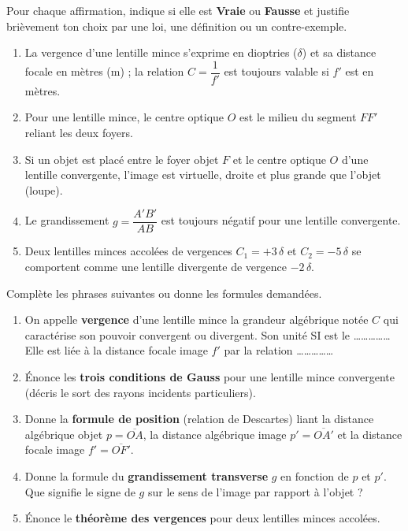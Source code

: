 \documentclass[11pt]{article}
\begin{document}
\begin{exercice}
Pour chaque affirmation, indique si elle est \textbf{Vraie} ou \textbf{Fausse} et justifie brièvement ton choix par une loi, une définition ou un contre-exemple.
\begin{enumerate}
    \item La vergence d'une lentille mince s'exprime en dioptries ($\delta$) et sa distance focale en mètres (m) ; la relation $C = \dfrac{1}{f'}$ est toujours valable si $f'$ est en mètres.
    \item Pour une lentille mince, le centre optique $O$ est le milieu du segment $FF'$ reliant les deux foyers.
    \item Si un objet est placé entre le foyer objet $F$ et le centre optique $O$ d'une lentille convergente, l'image est virtuelle, droite et plus grande que l'objet (loupe).
    \item Le grandissement $g = \dfrac{A'B'}{AB}$ est toujours négatif pour une lentille convergente.
    \item Deux lentilles minces accolées de vergences $C_1 = +3\,\delta$ et $C_2 = -5\,\delta$ se comportent comme une lentille divergente de vergence $-2\,\delta$.
\end{enumerate}
\end{exercice}

\begin{exercice}
Complète les phrases suivantes ou donne les formules demandées.
\begin{enumerate}
    \item On appelle \textbf{vergence} d'une lentille mince la grandeur algébrique notée $C$ qui caractérise son pouvoir convergent ou divergent. Son unité SI est le \ldots\ldots\ldots\ldots\ldots Elle est liée à la distance focale image $f'$ par la relation \ldots\ldots\ldots\ldots\ldots
    \item Énonce les \textbf{trois conditions de Gauss} pour une lentille mince convergente (décris le sort des rayons incidents particuliers).
    \item Donne la \textbf{formule de position} (relation de Descartes) liant la distance algébrique objet $p = \overline{OA}$, la distance algébrique image $p' = \overline{OA'}$ et la distance focale image $f' = \overline{OF'}$.
    \item Donne la formule du \textbf{grandissement transverse} $g$ en fonction de $p$ et $p'$. Que signifie le signe de $g$ sur le sens de l'image par rapport à l'objet ?
    \item Énonce le \textbf{théorème des vergences} pour deux lentilles minces accolées.
\end{enumerate}
\end{exercice}
\end{document}
